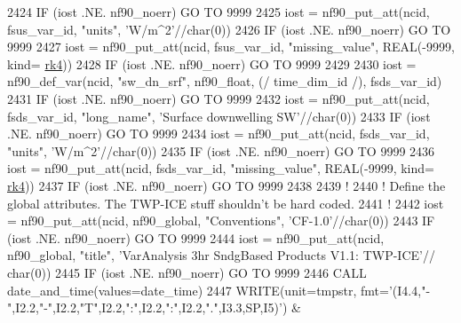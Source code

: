 \begin{DoxyCode}
{{{{{{2424     \textcolor{keywordflow}{IF} (iost .NE. nf90\_noerr) \textcolor{keywordflow}{GO TO} 9999
2425     iost    = nf90\_put\_att(ncid, fsus\_var\_id, \textcolor{stringliteral}{"units"}, \textcolor{stringliteral}{'W/m^2'}//char(0))
2426     \textcolor{keywordflow}{IF} (iost .NE. nf90\_noerr) \textcolor{keywordflow}{GO TO} 9999
2427     iost    = nf90\_put\_att(ncid, fsus\_var\_id, \textcolor{stringliteral}{"missing\_value"}, \textcolor{keywordtype}{REAL}(-9999, kind=
      \hyperlink{namespaceportable_abaed22a509442771d3fba69bebda0b33}{rk4}))
2428     \textcolor{keywordflow}{IF} (iost .NE. nf90\_noerr) \textcolor{keywordflow}{GO TO} 9999
2429 
2430     iost    = nf90\_def\_var(ncid, \textcolor{stringliteral}{"sw\_dn\_srf"}, nf90\_float, (/ time\_dim\_id /), fsds\_var\_id)
2431     \textcolor{keywordflow}{IF} (iost .NE. nf90\_noerr) \textcolor{keywordflow}{GO TO} 9999
2432     iost    = nf90\_put\_att(ncid, fsds\_var\_id, \textcolor{stringliteral}{"long\_name"}, \textcolor{stringliteral}{'Surface downwelling SW'}//char(0))
2433     \textcolor{keywordflow}{IF} (iost .NE. nf90\_noerr) \textcolor{keywordflow}{GO TO} 9999
2434     iost    = nf90\_put\_att(ncid, fsds\_var\_id, \textcolor{stringliteral}{"units"}, \textcolor{stringliteral}{'W/m^2'}//char(0))
2435     \textcolor{keywordflow}{IF} (iost .NE. nf90\_noerr) \textcolor{keywordflow}{GO TO} 9999
2436     iost    = nf90\_put\_att(ncid, fsds\_var\_id, \textcolor{stringliteral}{"missing\_value"}, \textcolor{keywordtype}{REAL}(-9999, kind=
      \hyperlink{namespaceportable_abaed22a509442771d3fba69bebda0b33}{rk4}))
2437     \textcolor{keywordflow}{IF} (iost .NE. nf90\_noerr) \textcolor{keywordflow}{GO TO} 9999
2438 
2439     \textcolor{comment}{!}
2440     \textcolor{comment}{! Define the global attributes. The TWP-ICE stuff shouldn't be hard coded.}
2441     \textcolor{comment}{!}
2442     iost    = nf90\_put\_att(ncid, nf90\_global, \textcolor{stringliteral}{"Conventions"}, \textcolor{stringliteral}{'CF-1.0'}//char(0))
2443     \textcolor{keywordflow}{IF} (iost .NE. nf90\_noerr) \textcolor{keywordflow}{GO TO} 9999
2444     iost    = nf90\_put\_att(ncid, nf90\_global, \textcolor{stringliteral}{"title"}, \textcolor{stringliteral}{'VarAnalysis 3hr SndgBased Products V1.1: TWP-ICE'}//
      char(0))
2445     \textcolor{keywordflow}{IF} (iost .NE. nf90\_noerr) \textcolor{keywordflow}{GO TO} 9999
2446     \textcolor{keyword}{CALL }date\_and\_time(values=date\_time)
2447     \textcolor{keyword}{WRITE}(unit=tmpstr, fmt=\textcolor{stringliteral}{'(I4.4,"-",I2.2,"-",I2.2,"T",I2.2,":",I2.2,":",I2.2,".",I3.3,SP,I5)'}) &
}}}}}}
\end{DoxyCode}
